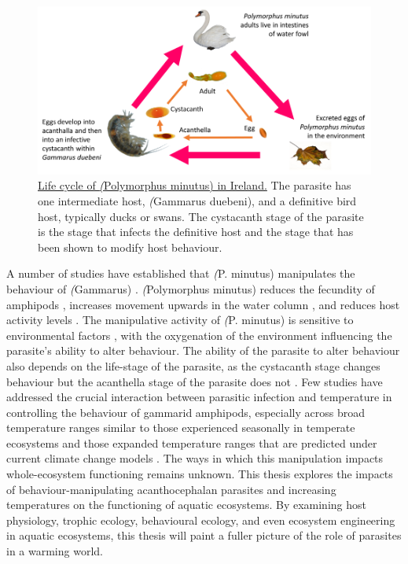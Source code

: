 
\begin{figure}[H] %
	  \centering
	  \includegraphics[keepaspectratio,totalheight=0.8\textheight]{figures/ch1/pminutus_lifecycle.png}
	    \caption[Life cycle of \emph(Polymorphus minutus in Ireland)] %
	    {\underline{Life cycle of \emph(Polymorphus minutus) in Ireland.} The parasite has one intermediate host, \emph(Gammarus duebeni), and a definitive bird host, typically ducks or swans. The cystacanth stage of the parasite is the stage that infects the definitive host and the stage that has been shown to modify host behaviour.}%
	  \label{fig:lifecycle}
	\end{figure}
	


A number of studies have established that \emph(P. minutus) manipulates the behaviour of \emph(Gammarus) \citep{kaldonski2008, perrot2016}. \emph(Polymorphus minutus) reduces the fecundity of amphipods \citep{dezfuli1999}, increases movement upwards in the water column \citep{perrot2016}, and reduces host activity levels \citep{jacquin2014}. The manipulative activity of \emph(P. minutus) is sensitive to environmental factors \citep{perrot2016}, with the oxygenation of the environment influencing the parasite’s ability to alter behaviour. The ability of the parasite to alter behaviour also depends on the life-stage of the parasite, as the cystacanth stage changes behaviour but the acanthella stage of the parasite does not \citep{bailly2017}. Few studies have addressed the crucial interaction between parasitic infection and temperature in controlling the behaviour of gammarid amphipods, especially across broad temperature ranges similar to those experienced seasonally in temperate ecosystems and those expanded temperature ranges that are predicted under current climate change models \citep{labaude2017, labaude2016}. The ways in which this manipulation impacts whole-ecosystem functioning remains unknown. This thesis explores the impacts of behaviour-manipulating acanthocephalan parasites and increasing temperatures on the functioning of aquatic ecosystems. By examining host physiology, trophic ecology, behavioural ecology, and even ecosystem engineering in aquatic ecosystems, this thesis will paint a fuller picture of the role of parasites in a warming world. 

